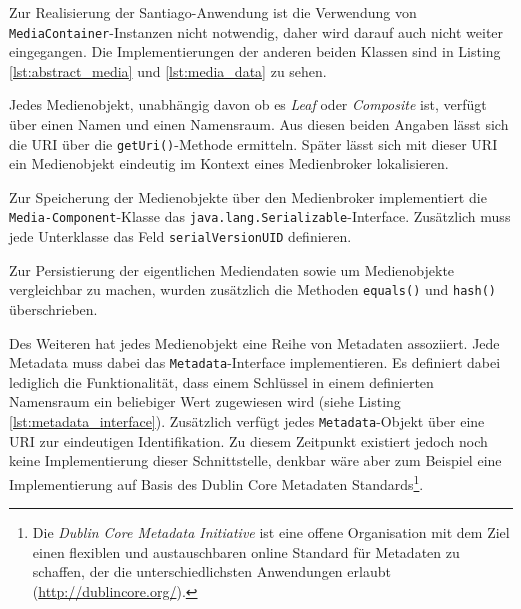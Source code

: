   Zur Realisierung der Santiago-Anwendung ist die Verwendung von \verb!MediaContainer!-Instanzen nicht notwendig, daher wird darauf auch nicht weiter eingegangen. Die Implementierungen der anderen beiden Klassen sind in Listing \ref{lst:abstract_media} und \ref{lst:media_data} zu sehen.

  

  
  
  Jedes Medienobjekt, unabhängig davon ob es \emph{Leaf} oder \emph{Composite} ist, verfügt über einen Namen und einen Namensraum. Aus diesen beiden Angaben lässt sich die URI über die \verb!getUri()!-Methode ermitteln. Später lässt sich mit dieser URI ein Medienobjekt eindeutig im Kontext eines Medienbroker lokalisieren.
  
  Zur Speicherung der Medienobjekte über den Medienbroker implementiert die \verb!Media-Component!-Klasse das \verb!java.lang.Serializable!-Interface. Zusätzlich muss jede Unterklasse das Feld \verb!serialVersionUID! definieren.
  
  Zur Persistierung der eigentlichen Mediendaten sowie um Medienobjekte vergleichbar zu machen, wurden zusätzlich die Methoden \verb!equals()! und \verb!hash()! überschrieben.
  
  Des Weiteren hat jedes Medienobjekt eine Reihe von Metadaten assoziiert. Jede Metadata muss dabei das \verb!Metadata!-Interface implementieren. Es definiert dabei lediglich die Funktionalität, dass einem Schlüssel in einem definierten Namensraum ein beliebiger Wert zugewiesen wird (siehe Listing \ref{lst:metadata_interface}). Zusätzlich verfügt jedes \verb!Metadata!-Objekt über eine URI zur eindeutigen Identifikation. Zu diesem Zeitpunkt existiert jedoch noch keine Implementierung dieser Schnittstelle, denkbar wäre aber zum Beispiel eine Implementierung auf Basis des Dublin Core Metadaten Standards\footnote{Die \emph{Dublin Core Metadata Initiative} ist eine offene Organisation mit dem Ziel einen flexiblen und austauschbaren online Standard für Metadaten zu schaffen, der die unterschiedlichsten Anwendungen erlaubt (\url{http://dublincore.org/}).}.
  
